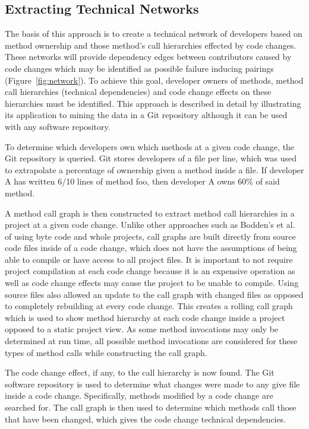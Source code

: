 \documentclass[conference]{IEEEtran}
\begin{document}
\subsection{Extracting Technical Networks}
The basis of this approach is to create a technical network of developers based on method ownership
and those method's call hierarchies effected by code changes. These networks will provide
dependency edges between contributors caused by code changes which may be 
identified as possible failure inducing pairings (Figure~\ref{fig:network}). To achieve this goal,
developer owners of methods, method call hierarchies (technical
dependencies) and code change effects on these hierarchies must be identified.
This approach is described in detail by illustrating its application to mining the data in a Git
repository although it can be used with any software repository.

To determine which developers own which methods at a given code change,
the Git repository is queried. Git stores developers of a file per line, which was used to extrapolate
a percentage of ownership given a method inside a file. If developer A has written 6/10 lines of 
method foo, then developer A owns 60\% of said method.

A method call graph is then constructed to extract method call hierarchies in a project at a given code change. 
Unlike other approaches such as Bodden's et al.~\cite{Bodden:2003:HVJ} 
of using byte code and whole projects, call graphs are built directly from source code files
inside of a code change, 
which does not have the assumptions of being able to compile or have access to all project 
files. It is important to not require project compilation at each code change because it is
an expensive operation as well as code change effects may cause the project
to be unable to compile. Using source files also allowed an update to the call graph
with changed files as opposed to completely rebuilding at 
every code change. This creates a rolling call graph which 
is used to show method hierarchy at each code change inside a project opposed to
a static project view. As some method invocations may only be determined at run time, all
possible method invocations are considered for these types of method calls while constructing
the call graph.

The code change effect, if any, to the call hierarchy is now found. The Git
software repository is used to determine what changes were made to any give file inside a 
code change. Specifically, methods modified by a code change are searched for. The call graph 
is then used to determine which methods call those that have been changed, which
gives the code change technical dependencies.
\end{document}
